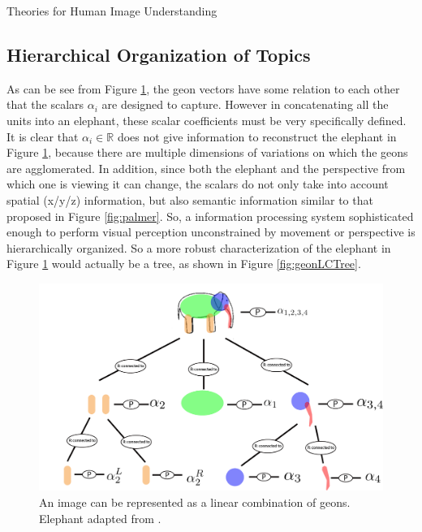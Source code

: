 \documentclass[12pt]{pom_thesis}
\begin{document}
\begin{chapter}{Theories for Human Image Understanding}
\subsection*{Hierarchical Organization of Topics}
As can be see from Figure \ref{fig:geonLC}, the geon vectors have some relation to each other that the scalars $\alpha_i$ are designed to capture. However in concatenating all the units into an elephant, these scalar coefficients must be very specifically defined. It is clear that $\alpha_i \in \mathbb{R}$ does not give information  to reconstruct the elephant in Figure \ref{fig:geonLC}, because there are multiple dimensions of variations on which the geons are agglomerated. In addition, since both the elephant and the perspective from which one is viewing it can change,  the scalars do not only take into account spatial (x/y/z) information, but also semantic information similar to that proposed in Figure \ref{fig:palmer}. So, a information processing system sophisticated enough to perform visual perception unconstrained by movement or perspective is hierarchically organized. So a more robust characterization of the elephant in Figure \ref{fig:geonLC} would actually be a tree, as shown in Figure \ref{fig:geonLCTree}.
\begin{figure}[h]
	\label{fig:geonLC}
	\centering
	\includegraphics[width=15cm]{geonLCTree}
	\caption{An image can be represented as a linear combination of geons. Elephant adapted from \cite{biederman1987recognition}.}
\end{figure}
\end{chapter}
\end{document}
